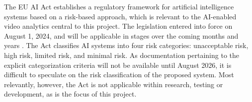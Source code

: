 The EU AI Act establishes a regulatory framework for artificial intelligence systems based on a risk-based approach, which is relevant to the AI-enabled video analytics central to this project. The legislation entered into force on August 1, 2024, and will be applicable in stages over the coming months and years \cite{ai_act_passed}. The Act classifies AI systems into four risk categories: unacceptable risk, high risk, limited risk, and minimal risk. As documentation pertaining to the explicit categorization criteria will not be available until August 2026, it is difficult to speculate on the risk classification of the proposed system. Most relevantly, however, the Act is not applicable within research, testing or development, as is the focus of this project.
